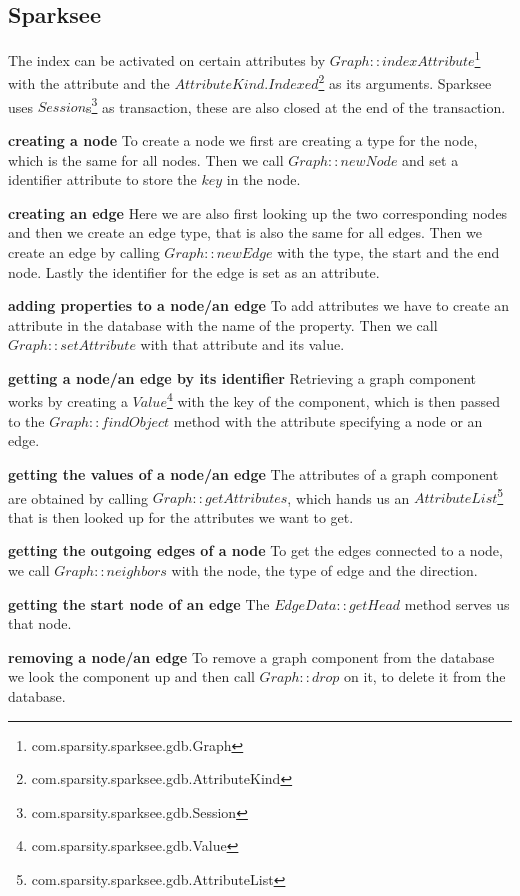 \subsection{Sparksee}
The index can be activated on certain attributes by $ Graph::indexAttribute $\footnote{com.sparsity.sparksee.gdb.Graph} with the attribute and the $ AttributeKind.Indexed $\footnote{com.sparsity.sparksee.gdb.AttributeKind} as its arguments.
Sparksee uses $ Session $s\footnote{com.sparsity.sparksee.gdb.Session} as transaction,
these are also closed at the end of the transaction.

\textbf{creating a node} \newline
To create a node we first are creating a type for the node,
which is the same for all nodes.
Then we call $ Graph::newNode $ and set a identifier attribute to store the $ key $ in the node.

\textbf{creating an edge} \newline
Here we are also first looking up the two corresponding nodes and then we create an edge type,
that is also the same for all edges.
Then we create an edge by calling $ Graph::newEdge $ with the type,
the start and the end node.
Lastly the identifier for the edge is set as an attribute.

\textbf{adding properties to a node/an edge} \newline
To add attributes we have to create an attribute in the database with the name of the property.
Then we call $ Graph::setAttribute $ with that attribute and its value.

\textbf{getting a node/an edge by its identifier} \newline
Retrieving a graph component works by creating a $ Value $\footnote{com.sparsity.sparksee.gdb.Value} with the key of the component,
which is then passed to the $ Graph::findObject $ method with the attribute specifying a node or an edge.

\textbf{getting the values of a node/an edge} \newline
The attributes of a graph component are obtained by calling $ Graph::getAttributes $,
which hands us an $ AttributeList $\footnote{com.sparsity.sparksee.gdb.AttributeList} that is then looked up for the attributes we want to get.

\textbf{getting the outgoing edges of a node} \newline
To get the edges connected to a node,
we call $ Graph::neighbors $ with the node, the type of edge and the direction.

\textbf{getting the start node of an edge} \newline
The $ EdgeData::getHead $ method serves us that node.

\textbf{removing a node/an edge} \newline
To remove a graph component from the database we look the component up and then call $ Graph::drop $ on it,
to delete it from the database.
